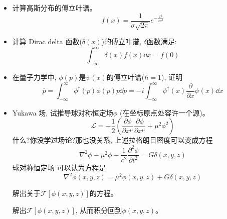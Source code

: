 \documentclass {ctexart}
\begin{document}
    \begin{itemize}
        \item 计算高斯分布的傅立叶谱。
                \begin{equation}
                    f(x) = \frac{1}{\sigma\sqrt{2\pi}} e^{-\frac{x^2}{2\sigma^2}}
                \end{equation}
        \item 计算 Dirac delta 函数(\(\delta(x)\))的傅立叶谱, \(\delta\)函数满足:
                \begin{equation}
                    \int_{-\infty}^{\infty} \delta(x) f(x) \dd x = f(0)
                \end{equation}
        \item 在量子力学中, \(\phi(p)\)是\(\psi(x)\)的傅立叶谱(\(\hbar = 1\)), 证明
                \begin{equation}
                    \overline{p} = \int_{-\infty}^{\infty} \phi^\dagger(p) \phi(p) p \dd p = -i \int_{-\infty}^{\infty} \psi^\dagger(x) \frac{\partial}{\partial x} \psi(x) \dd x
                \end{equation}
        \item Yukawa 场, 试推导球对称恒定场\(\phi\) (在坐标原点处容许一个源)。
                \begin{equation}
                    \mathscr {L} = -\frac{1}{2} (\frac{\partial \phi}{\partial x^\mu}\frac{\partial \phi}{\partial x^\mu} + \mu^2 \phi^2)
                \end{equation}
                什么?你没学过场论?那也没关系, 上述拉格朗日密度可以变成方程
                \begin{equation}
                    \nabla^2 \phi - \mu^2 \phi - \frac{1}{c^2}\frac{\partial^2 \phi}{\partial t^2} = G \delta(x,y,z)
                \end{equation}
                球对称恒定场 可以认为方程是
                \begin{equation}
                    \nabla^2 \phi(x,y,z) = \mu^2 \phi(x,y,z) + G \delta (x,y,z)
                \end{equation}
                
                解出关于\(\mathscr{F}[\phi(x,y,z)]\)的方程。

                解出\(\mathscr{F}[\phi(x,y,z)]\), 从而积分回到\(\phi(x,y,z)\)。

    \end{itemize}
\end{document}
